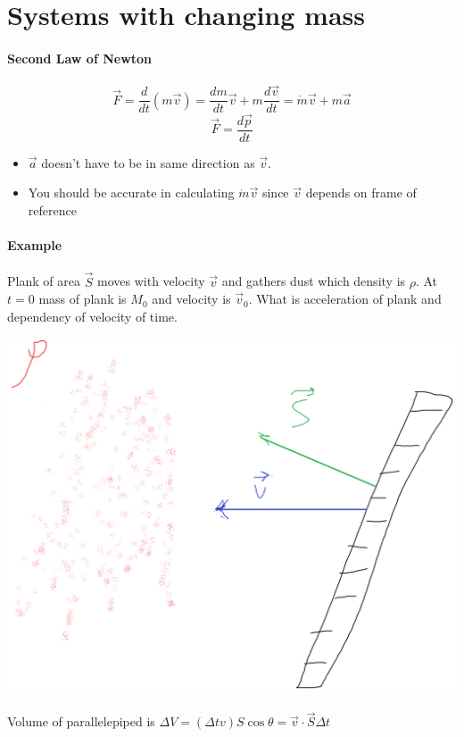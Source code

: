 \section{Systems with changing mass}
\paragraph{Second Law of Newton}
$$\vec{F} = \frac{d}{dt}\left( m \vec{v} \right) = \frac{dm}{dt}\vec{v} + m\frac{d\vec{v}}{dt} = \dot{m}\vec{v}+m\vec{a}$$
$$\vec{F} = \frac{d\vec{p}}{dt}$$
\begin{itemize}
	\item $\vec{a}$ doesn't have to be in same direction as $\vec{v}$. 
	\item You should be accurate in calculating $\dot{m}\vec{v}$ since $\vec{v}$ depends on frame of reference 
\end{itemize}

\paragraph{Example} Plank of area $\vec{S}$ moves with velocity $\vec{v}$ and gathers dust which density is $\rho$. At $t=0$ mass of plank is $M_0$ and velocity is $\vec{v}_0$. What is acceleration of plank and dependency of velocity of time.


\begin{center}
	\includegraphics[width=\linewidth]{./lect13/pic1.png}
\end{center}

Volume of parallelepiped is $\Delta V = \left( \Delta t v \right) S \cos \theta = \vec{v} \cdot \vec{S} \Delta t$

